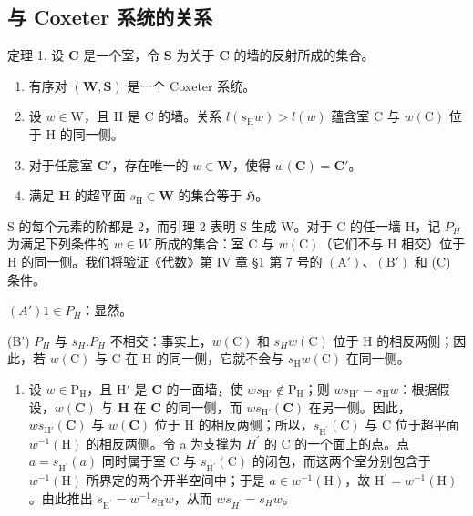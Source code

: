\subsection{与 Coxeter 系统的关系}

定理 1. 设 \(\mathbf{C}\) 是一个室，令 \(\mathbf{S}\) 为关于 \(\mathbf{C}\) 的墙的反射所成的集合。

\begin{enumerate}
\def\labelenumi{(\roman{enumi})}
\item
有序对 \((\mathbf{W},\mathbf{S})\) 是一个 Coxeter 系统。
\item
设 \(w \in \mathrm{W}\)，且 \(\mathrm{H}\) 是 \(\mathrm{C}\) 的墙。关系 \(l(s_{\mathrm{H}}w) > l(w)\) 蕴含室 \(\mathrm{C}\) 与 \(w(\mathrm{C})\) 位于 \(\mathrm{H}\) 的同一侧。
\item
对于任意室 \(\mathbf{C}'\)，存在唯一的 \(w \in \mathbf{W}\)，使得 \(w(\mathbf{C}) = \mathbf{C}'\)。
\item
满足 \(\mathbf{H}\) 的超平面 \(s_{\mathrm{H}} \in \mathbf{W}\) 的集合等于 \(\mathfrak{H}\)。
\end{enumerate}

S 的每个元素的阶都是 2，而引理 2 表明 S 生成 W。对于 C 的任一墙 H，记 \(P_{H}\) 为满足下列条件的 \(w \in W\) 所成的集合：室 C 与 \(w(\mathrm{C})\)（它们不与 H 相交）位于 H 的同一侧。我们将验证《代数》第 IV 章 §1 第 7 号的 \((\mathrm{A}')\)、\((\mathrm{B}')\) 和 (C) 条件。

\((A') 1 \in P_H\)：显然。

(B') \(P_{H}\) 与 \(s_{H}.P_{H}\) 不相交：事实上，\(w(\mathrm{C})\) 和 \(s_{H}w(\mathrm{C})\) 位于 H 的相反两侧；因此，若 \(w(\mathrm{C})\) 与 C 在 H 的同一侧，它就不会与 \(s_{\mathrm{H}}w(\mathrm{C})\) 在同一侧。

\begin{enumerate}
\def\labelenumi{(\Alph{enumi})}
\setcounter{enumi}{2}
\tightlist
\item
设 \(w \in \mathrm{P_H}\)，且 \(\mathrm{H}'\) 是 \(\mathbf{C}\) 的一面墙，使 \(ws_{\mathrm{H}'} \notin \mathrm{P_H}\)；则 \(ws_{\mathrm{H}'} = s_{\mathrm{H}}w\)：根据假设，\(w(\mathbf{C})\) 与 \(\mathbf{H}\) 在 \(\mathbf{C}\) 的同一侧，而 \(ws_{\mathrm{H}'}(\mathbf{C})\) 在另一侧。因此，\(ws_{\mathrm{H}'}(\mathbf{C})\) 与 \(w(\mathbf{C})\) 位于 H 的相反两侧；所以，\(s_{\mathrm{H}^{\prime}}(\mathrm{C})\) 与 C 位于超平面 \(w^{-1}(\mathrm{H})\) 的相反两侧。令 a 为支撑为 \(H^{\prime}\) 的 C 的一个面上的点。点 \(a = s_{\mathrm{H}^{\prime}}(a)\) 同时属于室 C 与 \(s_{\mathrm{H}^{\prime}}(\mathrm{C})\) 的闭包，而这两个室分别包含于 \(w^{-1}(\mathrm{H})\) 所界定的两个开半空间中；于是 \(a \in w^{-1}(\mathrm{H})\)，故 \(\mathrm{H}^{\prime} = w^{-1}(\mathrm{H})\)。由此推出 \(s_{\mathrm{H}^{\prime}} = w^{-1}s_{\mathrm{H}}w\)，从而 \(ws_{H^{\prime}} = s_{H}w\)。
\end{enumerate}

